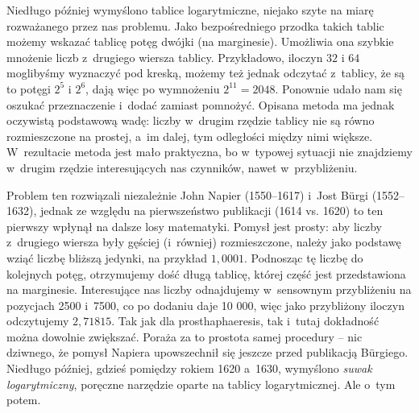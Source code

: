 Niedługo później wymyślono tablice logarytmiczne, 
niejako szyte na miarę rozważanego przez nas problemu. Jako bezpośredniego przodka takich tablic możemy wskazać tablicę potęg dwójki (na marginesie). Umożliwia ona szybkie mnożenie liczb z~drugiego wiersza tablicy. 
Przykładowo, iloczyn $32$ i $64$ moglibyśmy wyznaczyć pod kreską, możemy też jednak odczytać z~tablicy, że są to potęgi $2^5$ i $2^6$, dają więc po wymnożeniu $2^{11} = 2048$. Ponownie udało nam się oszukać przeznaczenie i~dodać zamiast pomnożyć. Opisana metoda ma jednak oczywistą podstawową wadę: liczby w~drugim rzędzie tablicy nie są równo rozmieszczone na prostej, a~im dalej, tym odległości między nimi większe. W~rezultacie metoda jest mało praktyczna, bo w~typowej sytuacji nie znajdziemy w~drugim rzędzie interesujących nas czynników, nawet w~przybliżeniu. 

Problem ten rozwiązali niezależnie John Napier (1550--1617) i~Jost B\"urgi (1552--1632), jednak ze względu na pierwszeństwo publikacji (1614 vs. 1620) to ten pierwszy wpłynął na dalsze losy matematyki. Pomysł jest prosty: aby liczby z~drugiego wiersza były gęściej (i~równiej) rozmieszczone, należy jako podstawę wziąć liczbę bliższą jedynki, na przykład $1{,}0001$. Podnosząc tę liczbę do kolejnych potęg, otrzymujemy dość długą tablicę, której część jest przedstawiona na marginesie. Interesujące nas liczby odnajdujemy w~sensownym przybliżeniu na pozycjach 2500 i~7500, co po dodaniu daje 10 000, więc jako przybliżony iloczyn odczytujemy $2{,}71815$. Tak jak dla prosthaphaeresis, tak i~tutaj dokładność można dowolnie zwiększać. Poraża za to prostota samej procedury -- nic dziwnego, że pomysł Napiera upowszechnił się jeszcze przed publikacją B\"urgiego. Niedługo później, gdzieś pomiędzy rokiem 1620 a~1630, wymyślono \emph{suwak logarytmiczny}, poręczne narzędzie oparte na tablicy logarytmicznej. Ale o~tym potem. 

